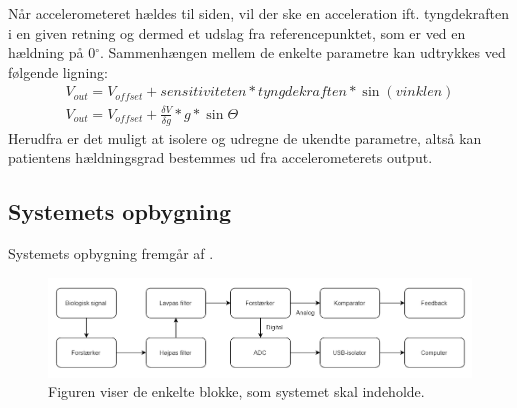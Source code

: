 Når accelerometeret hældes til siden, vil der ske en acceleration ift. tyngdekraften i en given retning og dermed et udslag fra referencepunktet, som er ved en hældning på 0$^{\circ}$. Sammenhængen mellem de enkelte parametre kan udtrykkes ved følgende ligning:\\ 
\begin{align}
	V_{out} = V_{offset} + sensitiviteten * tyngdekraften * \sin(vinklen) \\
	V_{out} = V_{offset} + \frac{\delta V}{\delta g} * g * \sin \Theta
\end{align}
Herudfra er det muligt at isolere og udregne de ukendte parametre, altså kan patientens hældningsgrad bestemmes ud fra accelerometerets output.


\subsection{Systemets opbygning} 
Systemets opbygning fremgår af .

\begin{figure}[H]
	\centering
	\includegraphics[scale=0.7]{figures/cProblemloesning/Systemopbygning.PNG}
	\caption{Figuren viser de enkelte blokke, som systemet skal indeholde.}
	\label{kravblok}
\end{figure}

